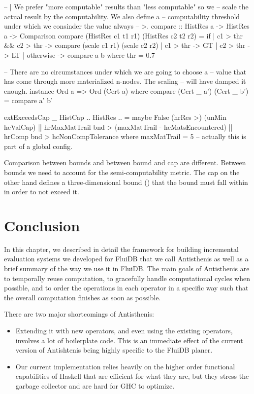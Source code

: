 \begin{code}
\begin{haskellcode}
-- | We prefer "more computable" results than "less computable" so we
-- scale the actual result by the computability. We also define a
-- computability threshold under which we consinder the value always
-- >.
compare :: HistRes a -> HistRes a -> Comparison
compare (HistRes c1 t1 r1) (HistRes c2 t2 r2) =
  if
    | c1 > thr && c2 > thr -> compare (scale c1 r1) (scale c2 r2)
    | c1 > thr             -> GT
    | c2 > thr             -> LT
    | otherwise            -> compare a b
  where
    thr = 0.7

-- There are no circumstances under which we are going to choose a
-- value that has come through more materialized n-nodes. The scaling
-- will have damped it enough.
instance Ord a => Ord (Cert a) where
  compare (Cert _ a') (Cert _ b') = compare a' b'

extExceedsCap _ HistCap {..} HistRes {..} =
  maybe False (hrRes >) (unMin hcValCap)
  || hrMaxMatTrail bnd > (maxMatTrail - hcMatsEncountered)
  || hrComp bnd > hcNonCompTolerance
  where
    maxMatTrail = 5 -- actually this is part of a global config.
\end{haskellcode}
\caption{\label{lst:hist_compare}Comparison between bounds and
  between bound and cap are different. Between bounds we need to
  account for the semi-computability metric. The cap on the other hand
  defines a three-dimensional bound () that the bound must fall
  within in order to not exceed it.}
\end{code}

\section{Conclusion}

In this chapter, we described in detail the framework for building
incremental evaluation systems we developed for FluiDB that we call
Antisthenis as well as a brief summary of the way we use it in
FluiDB. The main goals of Antisthenis are to temporally reuse computation, to
gracefully handle computational cycles when possible, and to order the operations in
each operator in a specific way such that the overall computation
finishes as soon as possible.

There are two major shortcomings of Antisthenis:

\begin{itemize}
\item Extending it with new operators, and even using the existing operators,
involves a lot of boilerplate code. This is an immediate effect of the
current version of Antishtenis being highly specific to the FluiDB
planer.
\item Our current implementation relies heavily on the higher order
functional capabilities of Haskell that are efficient for what they
are, but they stress the garbage collector and are hard for GHC to
optimize.
\end{itemize}

